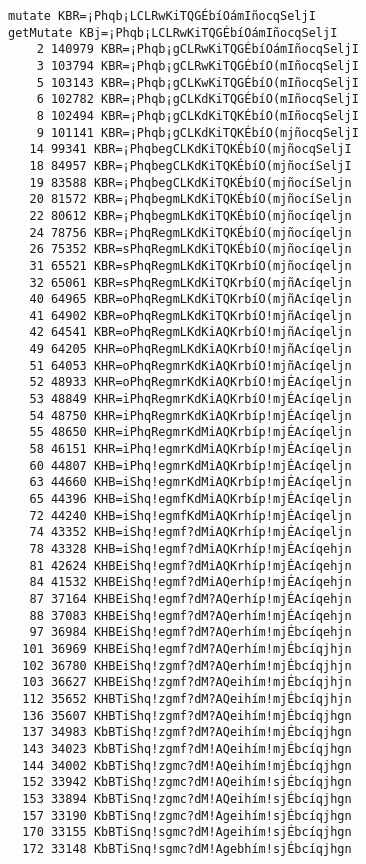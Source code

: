 \documentclass[11pt]{article}
\begin{document}
    \begin{Verbatim}[commandchars=\\\{\}]
mutate KBR=¡Phqb¡LCLRwKiTQGÉbíOámIñocqSeljI
getMutate KBj=¡Phqb¡LCLRwKiTQGÉbíOámIñocqSeljI
    2 140979 KBR=¡Phqb¡gCLRwKiTQGÉbíOámIñocqSeljI
    3 103794 KBR=¡Phqb¡gCLRwKiTQGÉbíO(mIñocqSeljI
    5 103143 KBR=¡Phqb¡gCLKwKiTQGÉbíO(mIñocqSeljI
    6 102782 KBR=¡Phqb¡gCLKdKiTQGÉbíO(mIñocqSeljI
    8 102494 KBR=¡Phqb¡gCLKdKiTQKÉbíO(mIñocqSeljI
    9 101141 KBR=¡Phqb¡gCLKdKiTQKÉbíO(mjñocqSeljI
   14 99341 KBR=¡PhqbegCLKdKiTQKÉbíO(mjñocqSeljI
   18 84957 KBR=¡PhqbegCLKdKiTQKÉbíO(mjñocíSeljI
   19 83588 KBR=¡PhqbegCLKdKiTQKÉbíO(mjñocíSeljn
   20 81572 KBR=¡PhqbegmLKdKiTQKÉbíO(mjñocíSeljn
   22 80612 KBR=¡PhqbegmLKdKiTQKÉbíO(mjñocíqeljn
   24 78756 KBR=¡PhqRegmLKdKiTQKÉbíO(mjñocíqeljn
   26 75352 KBR=sPhqRegmLKdKiTQKÉbíO(mjñocíqeljn
   31 65521 KBR=sPhqRegmLKdKiTQKrbíO(mjñocíqeljn
   32 65061 KBR=sPhqRegmLKdKiTQKrbíO(mjñAcíqeljn
   40 64965 KBR=oPhqRegmLKdKiTQKrbíO(mjñAcíqeljn
   41 64902 KBR=oPhqRegmLKdKiTQKrbíO!mjñAcíqeljn
   42 64541 KBR=oPhqRegmLKdKiAQKrbíO!mjñAcíqeljn
   49 64205 KHR=oPhqRegmLKdKiAQKrbíO!mjñAcíqeljn
   51 64053 KHR=oPhqRegmrKdKiAQKrbíO!mjñAcíqeljn
   52 48933 KHR=oPhqRegmrKdKiAQKrbíO!mjÉAcíqeljn
   53 48849 KHR=iPhqRegmrKdKiAQKrbíO!mjÉAcíqeljn
   54 48750 KHR=iPhqRegmrKdKiAQKrbíp!mjÉAcíqeljn
   55 48650 KHR=iPhqRegmrKdMiAQKrbíp!mjÉAcíqeljn
   58 46151 KHR=iPhq!egmrKdMiAQKrbíp!mjÉAcíqeljn
   60 44807 KHB=iPhq!egmrKdMiAQKrbíp!mjÉAcíqeljn
   63 44660 KHB=iShq!egmrKdMiAQKrbíp!mjÉAcíqeljn
   65 44396 KHB=iShq!egmfKdMiAQKrbíp!mjÉAcíqeljn
   72 44240 KHB=iShq!egmfKdMiAQKrhíp!mjÉAcíqeljn
   74 43352 KHB=iShq!egmf?dMiAQKrhíp!mjÉAcíqeljn
   78 43328 KHB=iShq!egmf?dMiAQKrhíp!mjÉAcíqehjn
   81 42624 KHBEiShq!egmf?dMiAQKrhíp!mjÉAcíqehjn
   84 41532 KHBEiShq!egmf?dMiAQerhíp!mjÉAcíqehjn
   87 37164 KHBEiShq!egmf?dM?AQerhíp!mjÉAcíqehjn
   88 37083 KHBEiShq!egmf?dM?AQerhím!mjÉAcíqehjn
   97 36984 KHBEiShq!egmf?dM?AQerhím!mjÉbcíqehjn
  101 36969 KHBEiShq!egmf?dM?AQerhím!mjÉbcíqjhjn
  102 36780 KHBEiShq!zgmf?dM?AQerhím!mjÉbcíqjhjn
  103 36627 KHBEiShq!zgmf?dM?AQeihím!mjÉbcíqjhjn
  112 35652 KHBTiShq!zgmf?dM?AQeihím!mjÉbcíqjhjn
  136 35607 KHBTiShq!zgmf?dM?AQeihím!mjÉbcíqjhgn
  137 34983 KbBTiShq!zgmf?dM?AQeihím!mjÉbcíqjhgn
  143 34023 KbBTiShq!zgmf?dM!AQeihím!mjÉbcíqjhgn
  144 34002 KbBTiShq!zgmc?dM!AQeihím!mjÉbcíqjhgn
  152 33942 KbBTiShq!zgmc?dM!AQeihím!sjÉbcíqjhgn
  153 33894 KbBTiSnq!zgmc?dM!AQeihím!sjÉbcíqjhgn
  157 33190 KbBTiSnq!zgmc?dM!Ageihím!sjÉbcíqjhgn
  170 33155 KbBTiSnq!sgmc?dM!Ageihím!sjÉbcíqjhgn
  172 33148 KbBTiSnq!sgmc?dM!Agebhím!sjÉbcíqjhgn

\end{Verbatim}
\end{document}
